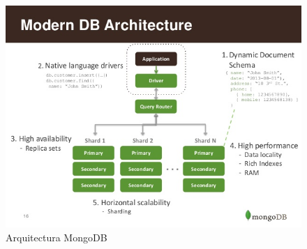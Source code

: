 \documentclass[a4paper,11pt]{book}
\begin{document}
\begin{figure}[H] 
\centering 
\includegraphics[scale=0.55]{imagenes/desarrollo_herramienta/mongo.jpg}
\caption{ Arquitectura MongoDB\cite{mongoA}  }  
\end{figure} 
\end{document}
